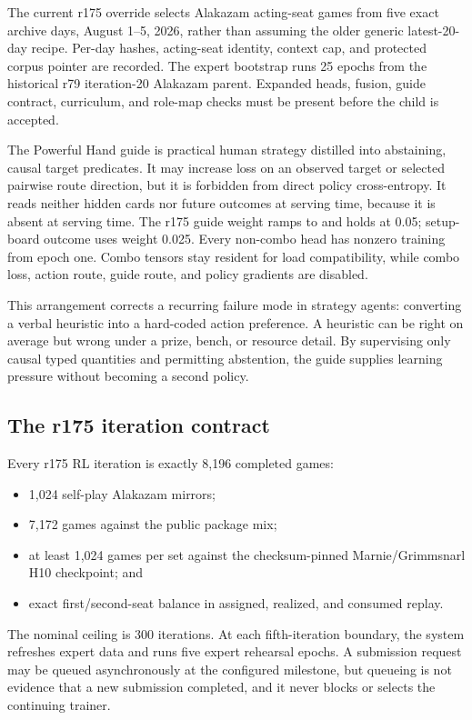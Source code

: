 \documentclass[10pt]{article}
\begin{document}
The current r175 override selects Alakazam acting-seat games from five exact archive days, August 1--5, 2026, rather than assuming the older generic latest-20-day recipe. Per-day hashes, acting-seat identity, context cap, and protected corpus pointer are recorded. The expert bootstrap runs 25 epochs from the historical r79 iteration-20 Alakazam parent. Expanded heads, fusion, guide contract, curriculum, and role-map checks must be present before the child is accepted.

The Powerful Hand guide is practical human strategy distilled into abstaining, causal target predicates. It may increase loss on an observed target or selected pairwise route direction, but it is forbidden from direct policy cross-entropy. It reads neither hidden cards nor future outcomes at serving time, because it is absent at serving time. The r175 guide weight ramps to and holds at 0.05; setup-board outcome uses weight 0.025. Every non-combo head has nonzero training from epoch one. Combo tensors stay resident for load compatibility, while combo loss, action route, guide route, and policy gradients are disabled.

This arrangement corrects a recurring failure mode in strategy agents: converting a verbal heuristic into a hard-coded action preference. A heuristic can be right on average but wrong under a prize, bench, or resource detail. By supervising only causal typed quantities and permitting abstention, the guide supplies learning pressure without becoming a second policy.

\subsection{The r175 iteration contract}

Every r175 RL iteration is exactly 8,196 completed games:

\begin{itemize}
\item 1,024 self-play Alakazam mirrors;
\item 7,172 games against the public package mix;
\item at least 1,024 games per set against the checksum-pinned Marnie/Grimmsnarl H10 checkpoint; and
\item exact first/second-seat balance in assigned, realized, and consumed replay.
\end{itemize}

The nominal ceiling is 300 iterations. At each fifth-iteration boundary, the system refreshes expert data and runs five expert rehearsal epochs. A submission request may be queued asynchronously at the configured milestone, but queueing is not evidence that a new submission completed, and it never blocks or selects the continuing trainer.
\end{document}
